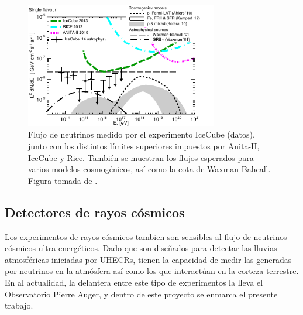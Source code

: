 		\begin{figure}[ht]
		\begin{center}
		\includegraphics[width=0.75\textwidth]{fig/introduccion/1510-02050_multimessenger_noAuger}
		\caption{\label{fig:multimess}  Flujo de neutrinos medido por el experimento IceCube (datos), junto con los distintos límites superiores impuestos por Anita-II, IceCube y Rice. Tambi\'en se muestran los flujos esperados para varios modelos cosmog\'enicos, as\'i como la cota de Waxman-Bahcall. Figura tomada de \cite{cite:multimess}.}
		\end{center}
	\end{figure}

	\subsection{Detectores de rayos c\'osmicos}
	
	Los experimentos de rayos c\'osmicos tambien son sensibles al flujo de neutrinos c\'osmicos ultra energ\'eticos. 
	Dado que son dise\~nados para detectar las lluvias atmosf\'ericas iniciadas por UHECRs, tienen la capacidad de medir las generadas por neutrinos en la atm\'osfera as\'i como los que interact\'uan en la corteza terrestre.
	En al actualidad, la delantera entre este tipo de experimentos la lleva el Observatorio Pierre Auger, y dentro de este proyecto se enmarca el presente trabajo. 	





